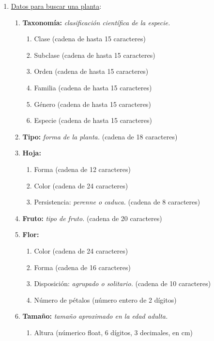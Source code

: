 \documentclass[10pt,a4paper]{article}
\begin{document}
\begin{enumerate}[label={RD\arabic*.} ,leftmargin=2.8\parindent]
 	\item \underline{Datos para buscar una planta}:
	\begin{enumerate}[label={RD9.\arabic*.}]
	
	\item 
		\textbf{Taxonomía:} \textit{clasificación científica de la especie.}
	\begin{enumerate}[label=-]
		\item Clase (cadena de hasta 15 caracteres)
		\item Subclase (cadena de hasta 15 caracteres)
		\item Orden (cadena de hasta 15 caracteres)
		\item Familia (cadena de hasta 15 caracteres)
		\item Género (cadena de hasta 15 caracteres)
		\item Especie (cadena de hasta 15 caracteres)
	\end{enumerate}
	\medskip
	
	\item 
		\textbf{Tipo:} \textit{forma de la planta.} (cadena de 18 caracteres)

	\medskip
	\item
		\textbf{Hoja:}
	\begin{enumerate}[label=-]
		\item Forma (cadena de 12 caracteres)
		\item Color (cadena de 24 caracteres)
		\item Persistencia: \textit{perenne o caduca.} (cadena de 8 caracteres)
	\end{enumerate}

	\medskip	
	\item
		\textbf{Fruto:} \textit{tipo de fruto.} (cadena de 20 caracteres)

	\medskip
	\item
		\textbf{Flor:}
	\begin{enumerate} [label=-]
		\item Color (cadena de 24 caracteres)
		\item Forma (cadena de 16 caracteres)
		\item Disposición: \textit{agrupado o solitario.} (cadena de 10 caracteres)
		\item Número de pétalos (número entero de 2 dígitos)
	\end{enumerate}

	\medskip
	\item
		\textbf{Tamaño:} \textit{tamaño aproximado en la edad adulta.}
	\begin{enumerate}[label=-]
		\item Altura (númerico float, 6 dígitos, 3 decimales, en cm)
	\end{enumerate}
	

\end{enumerate}
\end{enumerate}
\end{document}
